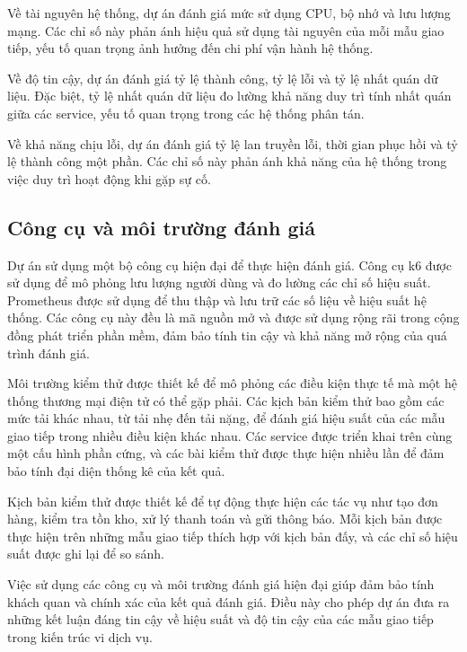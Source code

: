 Về tài nguyên hệ thống, dự án đánh giá mức sử dụng CPU, bộ nhớ và lưu lượng mạng. Các chỉ số này phản ánh hiệu quả sử dụng tài nguyên của mỗi mẫu giao tiếp, yếu tố quan trọng ảnh hưởng đến chi phí vận hành hệ thống.

Về độ tin cậy, dự án đánh giá tỷ lệ thành công, tỷ lệ lỗi và tỷ lệ nhất quán dữ liệu. Đặc biệt, tỷ lệ nhất quán dữ liệu đo lường khả năng duy trì tính nhất quán giữa các service, yếu tố quan trọng trong các hệ thống phân tán.

Về khả năng chịu lỗi, dự án đánh giá tỷ lệ lan truyền lỗi, thời gian phục hồi và tỷ lệ thành công một phần. Các chỉ số này phản ánh khả năng của hệ thống trong việc duy trì hoạt động khi gặp sự cố.

\subsection{Công cụ và môi trường đánh giá}
Dự án sử dụng một bộ công cụ hiện đại để thực hiện đánh giá. Công cụ k6 được sử dụng để mô phỏng lưu lượng người dùng và đo lường các chỉ số hiệu suất. Prometheus được sử dụng để thu thập và lưu trữ các số liệu về hiệu suất hệ thống. Các công cụ này đều là mã nguồn mở và được sử dụng rộng rãi trong cộng đồng phát triển phần mềm, đảm bảo tính tin cậy và khả năng mở rộng của quá trình đánh giá.

Môi trường kiểm thử được thiết kế để mô phỏng các điều kiện thực tế mà một hệ thống thương mại điện tử có thể gặp phải. Các kịch bản kiểm thử bao gồm các mức tải khác nhau, từ tải nhẹ đến tải nặng, để đánh giá hiệu suất của các mẫu giao tiếp trong nhiều điều kiện khác nhau. Các service được triển khai trên cùng một cấu hình phần cứng, và các bài kiểm thử được thực hiện nhiều lần để đảm bảo tính đại diện thống kê của kết quả.

Kịch bản kiểm thử được thiết kế để tự động thực hiện các tác vụ như tạo đơn hàng, kiểm tra tồn kho, xử lý thanh toán và gửi thông báo. Mỗi kịch bản được thực hiện trên những mẫu giao tiếp thích hợp với kịch bản đấy, và các chỉ số hiệu suất được ghi lại để so sánh.

Việc sử dụng các công cụ và môi trường đánh giá hiện đại giúp đảm bảo tính khách quan và chính xác của kết quả đánh giá. Điều này cho phép dự án đưa ra những kết luận đáng tin cậy về hiệu suất và độ tin cậy của các mẫu giao tiếp trong kiến trúc vi dịch vụ.